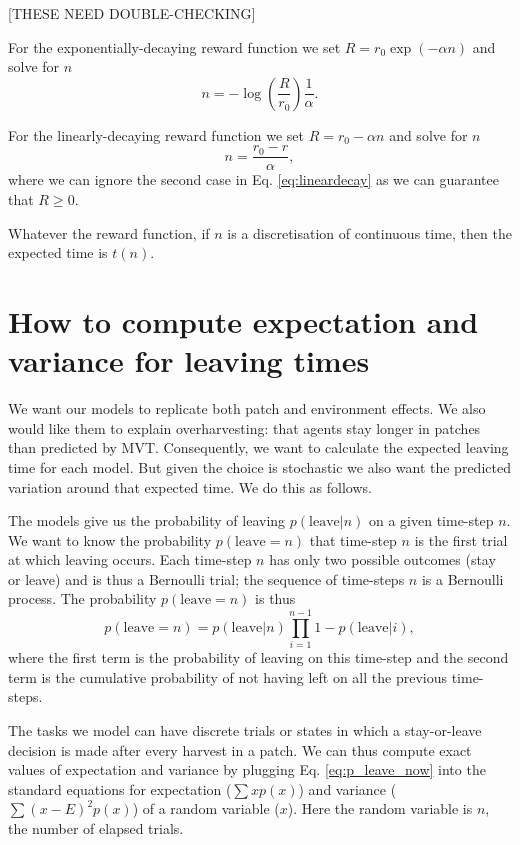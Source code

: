 \documentclass[11pt,a4paper]{article}
\begin{document}
[THESE NEED DOUBLE-CHECKING]

For the exponentially-decaying reward function we set $R = r_0\exp(-\alpha n)$ and solve for $n$
\begin{equation}
n = -\log\left(\frac{R}{r_0}\right)\frac{1}{\alpha}.
\end{equation}

For the linearly-decaying reward function we set $R = r_0 -\alpha n$ and solve for $n$
\begin{equation}
n = \frac{r_0 - r}{\alpha},
\end{equation}
where we can ignore the second case in Eq. \ref{eq:lineardecay} as we can guarantee that $R \geq 0$. 

Whatever the reward function, if $n$ is a discretisation of continuous time, then the expected time is $t(n)$.


\section{How to compute expectation and variance for leaving times}
We want our models to replicate both patch and environment effects. We also would like them to explain overharvesting: that agents stay longer in patches than predicted by MVT. Consequently, we want to calculate the expected leaving time for each model. But given the choice is stochastic we also want the predicted variation around that expected time. We do this as follows.

The models give us the probability of leaving $p(\mathrm{leave}|n)$ on a given time-step $n$. We want to know the probability $p(\mathrm{leave} = n)$  that time-step $n$ is the first trial at which leaving occurs. Each time-step $n$ has only two possible outcomes (stay or leave) and is thus a Bernoulli trial; the sequence of time-steps $n$ is a Bernoulli process. The probability $p(\mathrm{leave} = n)$ is thus
\begin{equation}\label{eq:p_leave_now}
p(\mathrm{leave} = n) = p(\mathrm{leave}|n) \prod_{i=1}^{n-1} 1-p(\mathrm{leave}|i),
\end{equation}  
where the first term is the probability of leaving on this time-step and the second term is the cumulative probability of not having left on all the previous time-steps.

The tasks we model can have discrete trials or states in which a stay-or-leave decision is made after every harvest in a patch. We can thus compute exact values of expectation and variance by plugging Eq. \ref{eq:p_leave_now} into the standard equations for expectation ($\sum xp(x)$) and variance ($\sum (x-E)^2p(x)$) of a random variable ($x$). Here the random variable is $n$, the number of elapsed trials.
\end{document}

